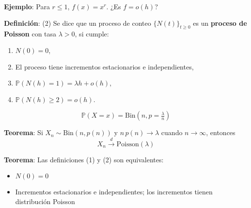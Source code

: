 \documentclass[12pt,a4paper]{article}
\newcommand{\definicion}[1]{%
\begin{definicionbox}
\textbf{Definición}: #1
\end{definicionbox}
}
\newcommand{\teorema}[1]{%
\begin{teoremabox}
\textbf{Teorema}: #1
\end{teoremabox}
}
\begin{document}
\textbf{Ejemplo}: Para $r \leq 1$, $f(x) = x^r$.  
¿Es $f = o(h)$?

\definicion{(2) Se dice que un proceso de conteo $\{N(t)\}_{t \geq 0}$ es un \textbf{proceso de Poisson} con tasa $\lambda > 0$, si cumple:
\begin{enumerate}
    \item $N(0) = 0$,
    \item El proceso tiene incrementos estacionarios e independientes,
    \item $\mathbb{P}(N(h) = 1) = \lambda h + o(h)$,
    \item $\mathbb{P}(N(h) \geq 2) = o(h)$.
\end{enumerate}}


\begin{center}
\end{center}

\begin{equation*}
\mathbb{P}(X = x) = \text{Bin}(n, p = \tfrac{\lambda}{n})
\end{equation*}

\teorema{Si $X_n \sim \text{Bin}(n, p(n))$ y $n \, p(n) \to \lambda$ cuando $n \to \infty$, entonces
\begin{equation*}
X_n \xrightarrow{d} \text{Poisson}(\lambda)
\end{equation*}}

\teorema{Las definiciones (1) y (2) son equivalentes:
\begin{itemize}
    \item $N(0) = 0$
    \item Incrementos estacionarios e independientes; los incrementos tienen distribución Poisson
\end{itemize}}
\end{document}
